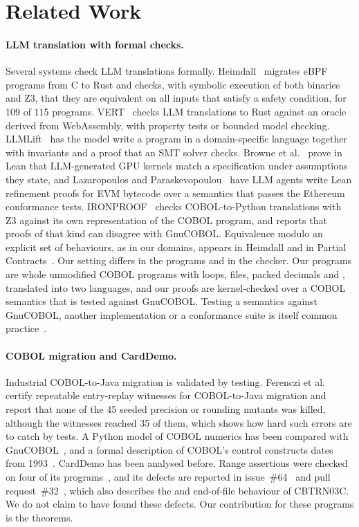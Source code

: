 \section{Related Work}
\label{sec:related}

\paragraph{LLM translation with formal checks.} Several systems check LLM translations formally. Heimdall~\cite{heimdall}
migrates eBPF programs from C to Rust and checks, with symbolic execution of both binaries and Z3, that they are
equivalent on all inputs that satisfy a safety condition, for 109 of 115 programs. VERT~\cite{vert} checks LLM
translations to Rust against an oracle derived from WebAssembly, with property tests or bounded model checking.
LLMLift~\cite{llmlift} has the model write a program in a domain-specific language together with invariants and a proof
that an SMT solver checks. Browne et al.~\cite{browne} prove in Lean that LLM-generated GPU kernels match a
specification under assumptions they state, and Lazaropoulos and Paraskevopoulou~\cite{equivm} have LLM agents write Lean
refinement proofs for EVM bytecode over a semantics that passes the Ethereum conformance tests. IRONPROOF~\cite{ironproof}
checks COBOL-to-Python translations with Z3 against its own representation of the COBOL program, and reports that
proofs of that kind can disagree with GnuCOBOL. Equivalence modulo an explicit set of behaviours, as in our domains,
appears in Heimdall and in Partial Contracts~\cite{partialcontracts}. Our setting differs in the programs and in the checker. Our programs are whole unmodified COBOL programs with loops,
files, packed decimals and , translated into two languages, and our proofs are kernel-checked over a
COBOL semantics that is tested against GnuCOBOL. Testing a semantics
against GnuCOBOL, another implementation or a conformance suite is itself common
practice~\cite{ironproof,cobolequiv,equivm}.

\paragraph{COBOL migration and CardDemo.} Industrial COBOL-to-Java migration is validated by testing. Ferenczi et
al.~\cite{amexwitness} certify repeatable entry-replay witnesses for COBOL-to-Java migration and report that none of the
45 seeded precision or rounding mutants was killed, although the witnesses reached 35 of them, which shows how hard such
errors are to catch by tests. A Python model of COBOL numerics
has been compared with GnuCOBOL~\cite{cobolequiv}, and a formal description of COBOL's control constructs dates from
1993~\cite{baumann}. CardDemo has been analysed before. Range assertions were checked on four of its
programs~\cite{carddemo54}, and its defects are reported in issue~\#64~\cite{carddemo64} and pull
request~\#32~\cite{carddemo32}, which also describes the  and end-of-file behaviour of CBTRN03C.
We do not claim to have found these defects. Our contribution for these programs is the theorems.


